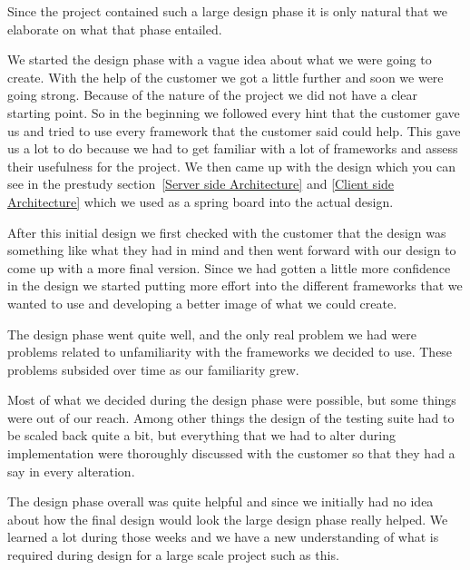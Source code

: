 Since the project contained such a large design phase it is only natural that we elaborate on what that phase entailed.

We started the design phase with a vague idea about what we were going to create. With the help of the customer we got a little further and soon we were going strong. Because of the nature of the project we did not have a clear starting point. So in the beginning we followed every hint that the customer gave us and tried to use every framework that the customer said could help. This gave us a lot to do because we had to get familiar with a lot of frameworks and assess their usefulness for the project. We then came up with the design which you can see in the prestudy section~\ref{Server side Architecture} and \ref{Client side Architecture} which we used as a spring board into the actual design.

After this initial design we first checked with the customer that the design was something like what they had in mind and then went forward with our design to come up with a more final version. Since we had gotten a little more confidence in the design we started putting more effort into the different frameworks that we wanted to use and developing a better image of what we could create.

The design phase went quite well, and the only real problem we had were problems related to unfamiliarity with the frameworks we decided to use. These problems subsided over time as our familiarity grew.

Most of what we decided during the design phase were possible, but some things were out of our reach. Among other things the design of the testing suite had to be scaled back quite a bit, but everything that we had to alter during implementation were thoroughly discussed with the customer so that they had a say in every alteration.

The design phase overall was quite helpful and since we initially had no idea about how the final design would look the large design phase really helped. We learned a lot during those weeks and we have a new understanding of what is required during design for a large scale project such as this.
